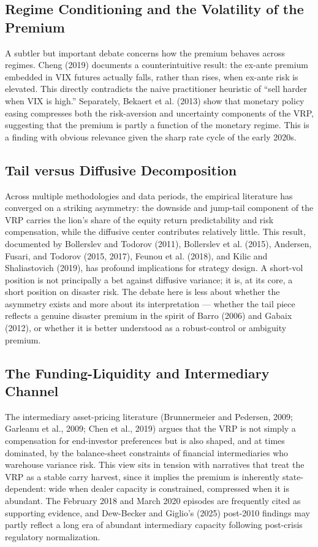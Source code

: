 \documentclass[11pt,a4paper]{article}
\begin{document}
\subsection{Regime Conditioning and the Volatility of the Premium}

A subtler but important debate concerns how the premium behaves across regimes. Cheng (2019) documents a counterintuitive result: the ex-ante premium embedded in VIX futures actually falls, rather than rises, when ex-ante risk is elevated. This directly contradicts the naive practitioner heuristic of ``sell harder when VIX is high.'' Separately, Bekaert et al. (2013) show that monetary policy easing compresses both the risk-aversion and uncertainty components of the VRP, suggesting that the premium is partly a function of the monetary regime. This is a finding with obvious relevance given the sharp rate cycle of the early 2020s.

\subsection{Tail versus Diffusive Decomposition}

Across multiple methodologies and data periods, the empirical literature has converged on a striking asymmetry: the downside and jump-tail component of the VRP carries the lion's share of the equity return predictability and risk compensation, while the diffusive center contributes relatively little. This result, documented by Bollerslev and Todorov (2011), Bollerslev et al. (2015), Andersen, Fusari, and Todorov (2015, 2017), Feunou et al. (2018), and Kilic and Shaliastovich (2019), has profound implications for strategy design. A short-vol position is not principally a bet against diffusive variance; it is, at its core, a short position on disaster risk. The debate here is less about whether the asymmetry exists and more about its interpretation --- whether the tail piece reflects a genuine disaster premium in the spirit of Barro (2006) and Gabaix (2012), or whether it is better understood as a robust-control or ambiguity premium.

\subsection{The Funding-Liquidity and Intermediary Channel}

The intermediary asset-pricing literature (Brunnermeier and Pedersen, 2009; Garleanu et al., 2009; Chen et al., 2019) argues that the VRP is not simply a compensation for end-investor preferences but is also shaped, and at times dominated, by the balance-sheet constraints of financial intermediaries who warehouse variance risk. This view sits in tension with narratives that treat the VRP as a stable carry harvest, since it implies the premium is inherently state-dependent: wide when dealer capacity is constrained, compressed when it is abundant. The February 2018 and March 2020 episodes are frequently cited as supporting evidence, and Dew-Becker and Giglio's (2025) post-2010 findings may partly reflect a long era of abundant intermediary capacity following post-crisis regulatory normalization.
\end{document}
